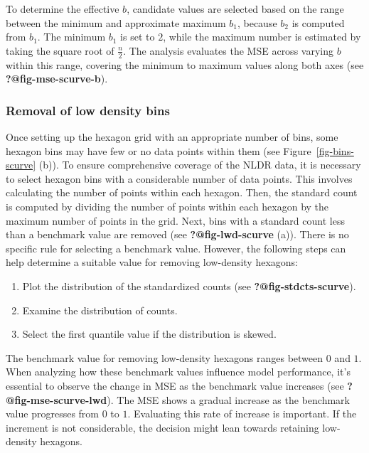 \documentclass[
  12pt]{article}
\providecommand{\tightlist}{%
  \setlength{\itemsep}{0pt}\setlength{\parskip}{0pt}}\usepackage{longtable,booktabs,array}
\def\tightlist{}
\begin{document}
To determine the effective \(b\), candidate values are selected based on
the range between the minimum and approximate maximum \(b_1\), because
\(b_2\) is computed from \(b_1\). The minimum \(b_1\) is set to \(2\),
while the maximum number is estimated by taking the square root of
\(\frac{n}{2}\). The analysis evaluates the MSE across varying \(b\)
within this range, covering the minimum to maximum values along both
axes (see \textbf{?@fig-mse-scurve-b}).

\subsubsection{Removal of low density
bins}\label{removal-of-low-density-bins}

Once setting up the hexagon grid with an appropriate number of bins,
some hexagon bins may have few or no data points within them (see
Figure~\ref{fig-bins-scurve} (b)). To ensure comprehensive coverage of
the NLDR data, it is necessary to select hexagon bins with a
considerable number of data points. This involves calculating the number
of points within each hexagon. Then, the standard count is computed by
dividing the number of points within each hexagon by the maximum number
of points in the grid. Next, bins with a standard count less than a
benchmark value are removed (see \textbf{?@fig-lwd-scurve} (a)). There
is no specific rule for selecting a benchmark value. However, the
following steps can help determine a suitable value for removing
low-density hexagons:

\begin{enumerate}
\def\labelenumi{\arabic{enumi}.}
\tightlist
\item
  Plot the distribution of the standardized counts (see
  \textbf{?@fig-stdcts-scurve}).
\item
  Examine the distribution of counts.
\item
  Select the first quantile value if the distribution is skewed.
\end{enumerate}

The benchmark value for removing low-density hexagons ranges between
\(0\) and \(1\). When analyzing how these benchmark values influence
model performance, it's essential to observe the change in MSE as the
benchmark value increases (see \textbf{?@fig-mse-scurve-lwd}). The MSE
shows a gradual increase as the benchmark value progresses from \(0\) to
\(1\). Evaluating this rate of increase is important. If the increment
is not considerable, the decision might lean towards retaining
low-density hexagons.
\end{document}
